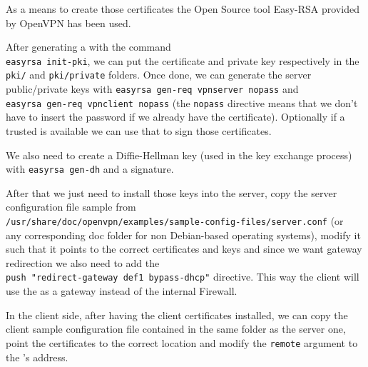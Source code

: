 As a means to create those certificates the Open Source tool Easy-RSA\cite{easyrsa} provided by OpenVPN has been used.

After generating a  with the command \\
\verb|easyrsa init-pki|, we can put the certificate and private key respectively in the \verb|pki/| and \verb|pki/private| folders. Once done, we can generate the server public/private keys with \verb|easyrsa gen-req vpnserver nopass|  and \\
\verb|easyrsa gen-req vpnclient nopass| (the \verb|nopass| directive means that we don't have to insert the password if we already have the certificate). Optionally if a trusted  is available we can use that to sign those certificates.

We also need to create a Diffie-Hellman\cite{diffie-hellman} key (used in the key exchange process) with \verb|easyrsa gen-dh| and a \cite{hmac} signature\cite{vultr}.

After that we just need to install those keys into the server, copy the server configuration file sample from \\
\verb|/usr/share/doc/openvpn/examples/sample-config-files/server.conf| (or\\ any corresponding doc folder for non Debian-based operating systems), modify it such that it points to the correct certificates and keys and since we want gateway redirection we also need to add the \\ \verb|push "redirect-gateway def1 bypass-dhcp"| directive. This way the client will use the  as a gateway instead of the internal Firewall.

In the client side, after having the client certificates installed, we can copy the client sample configuration file contained in the same folder as the server one, point the certificates to the correct location and modify the \verb|remote| argument to the 's  address.

\newpage


